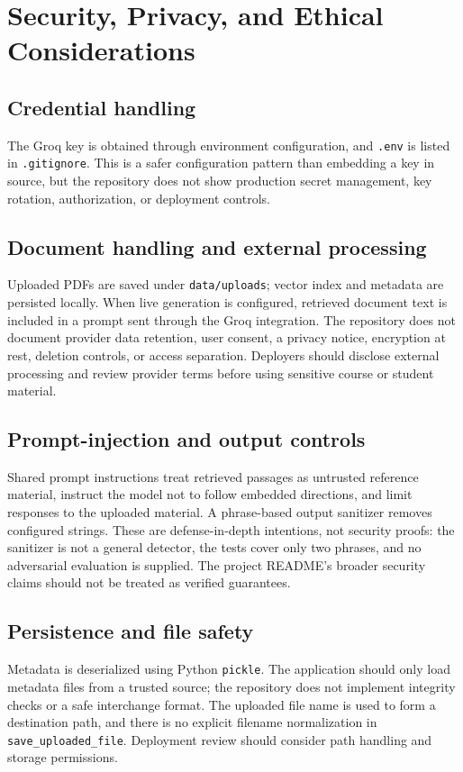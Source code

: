 \chapter{Security, Privacy, and Ethical Considerations}
\label{ch:security}

\section{Credential handling}
The Groq key is obtained through environment configuration, and \texttt{.env} is listed in \texttt{.gitignore}. This is a safer configuration pattern than embedding a key in source, but the repository does not show production secret management, key rotation, authorization, or deployment controls.

\section{Document handling and external processing}
Uploaded PDFs are saved under \texttt{data/uploads}; vector index and metadata are persisted locally. When live generation is configured, retrieved document text is included in a prompt sent through the Groq integration. The repository does not document provider data retention, user consent, a privacy notice, encryption at rest, deletion controls, or access separation. Deployers should disclose external processing and review provider terms before using sensitive course or student material.

\section{Prompt-injection and output controls}
Shared prompt instructions treat retrieved passages as untrusted reference material, instruct the model not to follow embedded directions, and limit responses to the uploaded material. A phrase-based output sanitizer removes configured strings. These are defense-in-depth intentions, not security proofs: the sanitizer is not a general detector, the tests cover only two phrases, and no adversarial evaluation is supplied. The project README's broader security claims should not be treated as verified guarantees.

\section{Persistence and file safety}
Metadata is deserialized using Python \texttt{pickle}. The application should only load metadata files from a trusted source; the repository does not implement integrity checks or a safe interchange format. The uploaded file name is used to form a destination path, and there is no explicit filename normalization in \texttt{save\_uploaded\_file}. Deployment review should consider path handling and storage permissions.


